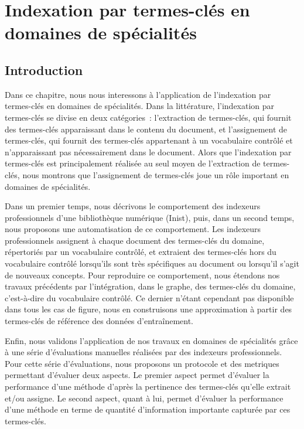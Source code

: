 \chapter{Indexation par termes-clés en domaines de spécialités}
\label{chap:main-domain_specific_keyphrase_annotation}


  \section{Introduction}
  \label{sec:main:domain_specific_keyphrase_annotation-introduction}
    Dans ce chapitre, nous nous interessons à l'application de l'indexation par
    termes-clés en domaines de spécialités. Dans la littérature, l'indexation
    par termes-clés se divise en deux catégories~: l'extraction de termes-clés,
    qui fournit des termes-clés apparaissant dans le contenu du document, et
    l'assignement de termes-clés, qui fournit des termes-clés appartenant à un
    vocabulaire contrôlé et n'apparaissant pas nécessairement dans le document.
    Alors que l'indexation par termes-clés est principalement réalisée au seul
    moyen de l'extraction de termes-clés, nous montrons que l'assignement de
    termes-clés joue un rôle important en domaines de spécialités.

    Dans un premier temps, nous décrivons le comportement des indexeurs
    professionnels d'une bibliothèque numérique (Inist), puis, dans un second
    temps, nous proposons une automatisation de ce comportement. Les indexeurs
    professionnels assignent à chaque document des termes-clés du domaine,
    répertoriés par un vocabulaire contrôlé, et extraient des termes-clés hors
    du vocabulaire contrôlé lorsqu'ils sont très spécifiques au document ou
    lorsqu'il s'agit de nouveaux concepts. Pour reproduire ce comportement, nous
    étendons nos travaux précédents par l'intégration, dans le graphe, des
    termes-clés du domaine, c'est-à-dire du vocabulaire contrôlé. Ce dernier
    n'étant cependant pas disponible dans tous les cas de figure, nous en
    construisons une approximation à partir des termes-clés de référence des
    données d'entraînement.

    Enfin, nous validons l'application de nos travaux en domaines de spécialités
    grâce à une série d'évaluations manuelles réalisées par des indexeurs
    professionnels. Pour cette série d'évaluations, nous proposons un protocole
    et des metriques permettant d'évaluer deux aspects. Le premier aspect permet
    d'évaluer la performance d'une méthode d'après la pertinence des termes-clés
    qu'elle extrait et/ou assigne. Le second aspect, quant à lui, permet
    d'évaluer la performance d'une méthode en terme de quantité d'information
    importante capturée par ces termes-clés.

